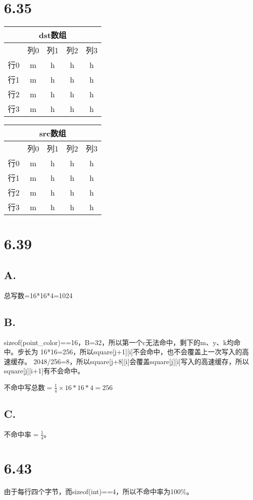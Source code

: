 \documentclass[11pt]{article}
\begin{document}
\section*{6.35}
\begin{tabular}[htbp!]{|c|c|c|c|c|}
  \multicolumn{5}{c}{dst数组} \\
  \hline
  & 列0 & 列1 & 列2 & 列3 \\
  \hline
  行0 & m & h & h & h \\
  \hline
  行1 & m & h & h & h \\
  \hline
  行2 & m & h & h & h \\
  \hline
  行3 & m & h & h & h \\
  \hline
\end{tabular}
\begin{tabular}[htbp!]{|c|c|c|c|c|}
  \multicolumn{5}{c}{src数组} \\
  \hline
  & 列0 & 列1 & 列2 & 列3 \\
  \hline
  行0 & m & h & h & h \\
  \hline
  行1 & m & h & h & h \\
  \hline
  行2 & m & h & h & h \\
  \hline
  行3 & m & h & h & h \\
  \hline
\end{tabular}

\section*{6.39}
\subsection*{A.}
总写数=16*16*4=1024
\subsection*{B.}
sizeof(point\_color)==16，B=32，所以第一个c无法命中，剩下的m、y、k均命中。步长为
16*16=256，所以square[j+1][i]不会命中，也不会覆盖上一次写入的高速缓存。
2048/256=8，所以square[j+8][i]会覆盖square[j][i]写入的高速缓存，所以
square[j][i+1]有不会命中。

不命中写总数$=\frac{1}{4} \times 16 * 16 * 4 = 256$
\subsection*{C.}
不命中率$=\frac{1}{4}$。

\section*{6.43}
由于每行四个字节，而sizeof(int)==4，所以不命中率为100\%。
\end{document}
